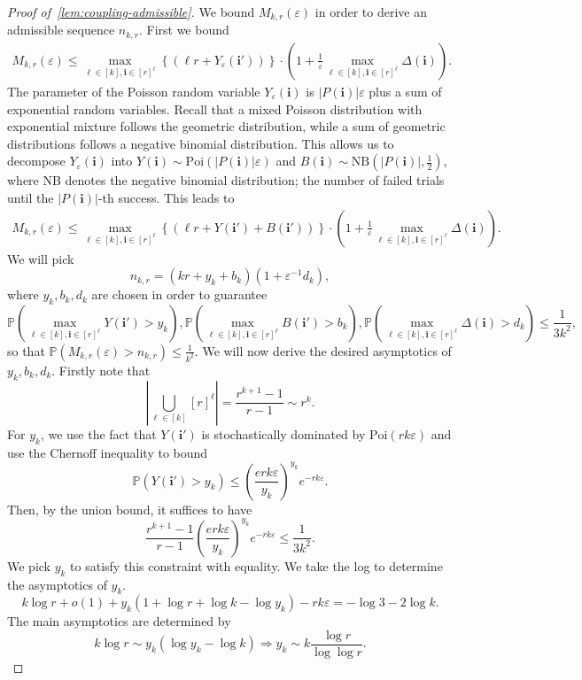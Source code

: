 \documentclass[11pt]{article}
\theoremstyle{definition}
\theoremstyle{remark}
\theoremstyle{remark}
\numberwithin{theorem}{section}
\providecommand{\P}{}
\renewcommand{\P}{\mathbb{P}}
\begin{document}
\begin{proof}[Proof of~\cref{lem:coupling-admissible}]
    We bound $M_{k,r}(\varepsilon)$ in order to derive an admissible sequence $n_{k,r}$.
    First we bound
    \begin{align*}
        M_{k,r}(\varepsilon)\le \max_{\ell\in[k],\bm i\in[r]^\ell}\left\{(\ell r+Y_{\varepsilon}(\bm i'))\right\}\cdot \left(1+\frac1\varepsilon\max_{\ell\in[k],\bm i\in [r]^\ell}\Delta(\bm i)\right).
    \end{align*}
    The parameter of the Poisson random variable $Y_{\varepsilon}(\bm i)$ is $|P(\bm i)|\varepsilon$ plus a sum of exponential random variables. Recall that a mixed Poisson distribution with exponential mixture follows the geometric distribution, while a sum of geometric distributions follows a negative binomial distribution. This allows us to decompose $Y_{\varepsilon}(\bm i)$ into $Y(\bm i)\sim\text{Poi}(|P(\bm i)|\varepsilon)$ and $B(\bm i)\sim \text{NB}(|P(\bm i)|,\frac12)$, where NB denotes the negative binomial distribution; the number of failed trials until the $|P(\bm i)|$-th success.
    This leads to
    \begin{align*}
        M_{k,r}(\varepsilon)\le \max_{\ell\in[k],\bm i\in[r]^\ell}\left\{(\ell r+Y(\bm i')+B(\bm i'))\right\}\cdot \left(1+\frac1\varepsilon\max_{\ell\in[k],\bm i\in [r]^\ell}\Delta(\bm i)\right).
    \end{align*}
    We will pick
    \[
    n_{k,r}=(kr+y_k+b_k)(1+\varepsilon^{-1}d_k),
    \]
    where $y_k,b_k,d_k$ are chosen in order to guarantee 
    \[
    \P\left(\max_{\ell\in[k],\bm i\in [r]^\ell}Y(\bm i')> y_k\right),\P\left(\max_{\ell\in[k],\bm i\in [r]^\ell}B(\bm i')> b_k\right),\P\left(\max_{\ell\in[k],\bm i\in [r]^\ell}\Delta(\bm i)> d_k\right)\le \frac1{3k^2},
    \]
    so that
    \(
    \P(M_{k,r}(\varepsilon)>n_{k,r})\le\frac1{k^2}.
    \)
    We will now derive the desired asymptotics of $y_k,b_k,d_k$.
    Firstly note that
    \[
    \left|\bigcup_{\ell\in[k]}[r]^\ell\right|=\frac{r^{k+1}-1}{r-1}\sim r^k.
    \]
    For $y_k$, we use the fact that $Y(\bm i')$ is stochastically dominated by $\text{Poi}(rk\varepsilon)$ and use the Chernoff inequality to bound
    \[
    \P(Y(\bm i')>y_k)\le \left(\frac{erk\varepsilon}{y_k}\right)^{y_k}e^{-rk\varepsilon}.
    \]
    Then, by the union bound, it suffices to have
    \[
    \frac{r^{k+1}-1}{r-1}\left(\frac{erk\varepsilon}{y_k}\right)^{y_k}e^{-rk\varepsilon}\le\frac1{3k^2}.
    \]
    We pick $y_k$ to satisfy this constraint with equality. We take the log to determine the asymptotics of $y_k$.
    \[
    k\log r+o(1)+y_k\left(1+\log r+\log k-\log y_k\right)-rk\varepsilon=-\log3-2\log k.
    \]
    The main asymptotics are determined by 
    \[
    k\log r\sim y_k\left(\log y_k-\log k\right)\Rightarrow y_k\sim k\frac{\log r}{\log\log r}.
    \]


\end{proof}
\end{document}
